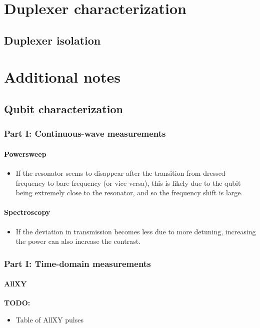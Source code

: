 

\chapter{Duplexer characterization}
  \section{Duplexer isolation}
  \label{ch:Duplexer isolation}


\chapter{Additional notes}
\section{Qubit characterization}
  \subsection{Part I: Continuous-wave measurements}
    \subsubsection{Powersweep}
      \begin{itemize}
        \item If the resonator seems to disappear after the transition from dressed frequency to bare frequency (or vice versa), this is likely due to the qubit being extremely close to the resonator, and so the frequency shift is large.
      \end{itemize}
    \subsubsection{Spectroscopy}
      \begin{itemize}
        \item If the deviation in transmission becomes less due to more detuning, increasing the power can also increase the contrast.
      \end{itemize}
  \subsection{Part I: Time-domain measurements}
    \subsubsection{AllXY}
      \label{ssec:AllXY}
      \textbf{TODO:}
      \begin{itemize}
        \item Table of AllXY pulses
      \end{itemize}
